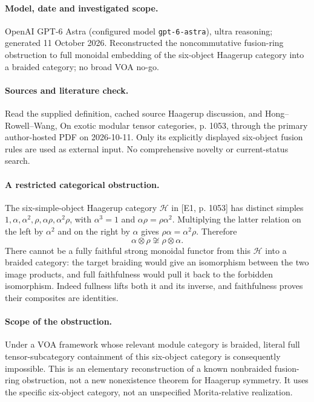 \documentclass[11pt]{article}
\begin{document}
\paragraph{Model, date and investigated scope.}
OpenAI GPT-6 Astra (configured model \texttt{gpt-6-astra}), ultra reasoning; generated 11 October 2026. Reconstructed the noncommutative fusion-ring obstruction to full monoidal embedding of the six-object Haagerup category into a braided category; no broad VOA no-go.

\paragraph{Sources and literature check.}
Read the supplied definition, cached source Haagerup discussion, and Hong–Rowell–Wang, On exotic modular tensor categories, p. 1053, through the primary author-hosted PDF on 2026-10-11. Only its explicitly displayed six-object fusion rules are used as external input. No comprehensive novelty or current-status search.

\paragraph{A restricted categorical obstruction.} The six-simple-object Haagerup category \(\mathcal H\) in [E1, p. 1053] has distinct simples \(1,\alpha,\alpha^2,\rho,\alpha\rho,\alpha^2\rho\), with \(\alpha^3=1\) and \(\alpha\rho=\rho\alpha^2\). Multiplying the latter relation on the left by \(\alpha^2\) and on the right by \(\alpha\) gives \(\rho\alpha=\alpha^2\rho\). Therefore
\[
 \alpha\otimes\rho\not\cong\rho\otimes\alpha.
\]
There cannot be a fully faithful strong monoidal functor from this \(\mathcal H\) into a braided category: the target braiding would give an isomorphism between the two image products, and full faithfulness would pull it back to the forbidden isomorphism. Indeed fullness lifts both it and its inverse, and faithfulness proves their composites are identities.
\paragraph{Scope of the obstruction.} Under a VOA framework whose relevant module category is braided, literal full tensor-subcategory containment of this six-object category is consequently impossible. This is an elementary reconstruction of a known nonbraided fusion-ring obstruction, not a new nonexistence theorem for Haagerup symmetry. It uses the specific six-object category, not an unspecified Morita-relative realization.
\end{document}
